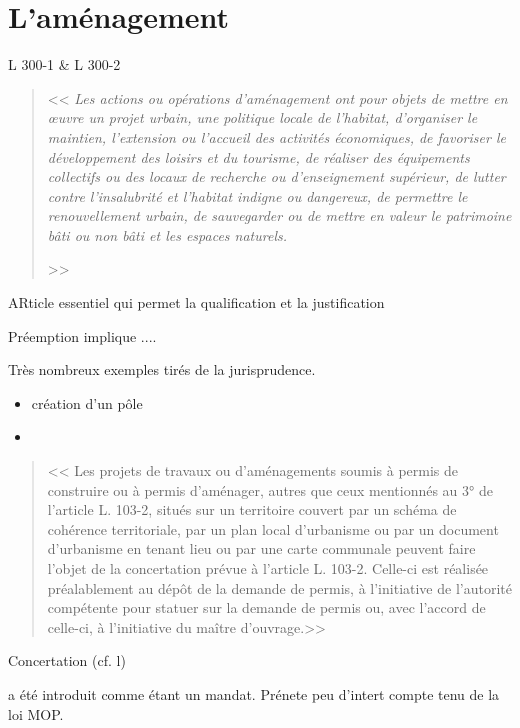 \chapter{L'aménagement}

L 300-1 \& L 300-2

	\begin{quote}
		\textbf{}

		<< {\itshape Les actions ou opérations d'aménagement ont pour objets de mettre en œuvre un projet urbain, une politique locale de l'habitat, d'organiser le maintien, l'extension ou l'accueil des activités économiques, de favoriser le développement des loisirs et du tourisme, de réaliser des équipements collectifs ou des locaux de recherche ou d'enseignement supérieur, de lutter contre l'insalubrité et l'habitat indigne ou dangereux, de permettre le renouvellement urbain, de sauvegarder ou de mettre en valeur le patrimoine bâti ou non bâti et les espaces naturels.}

		\lips >>
	\end{quote}

	ARticle essentiel qui permet la qualification et la justification

	Préemption implique ....

	Très nombreux exemples tirés de la jurisprudence.
	\begin{itemize}
		\item création d'un pôle
		\item
	\end{itemize}

	\begin{quote}
		\textbf{}

		<< {\itshape } Les projets de travaux ou d'aménagements soumis à permis de construire ou à permis d'aménager, autres que ceux mentionnés au 3° de l'article L. 103-2, situés sur un territoire couvert par un schéma de cohérence territoriale, par un plan local d'urbanisme ou par un document d'urbanisme en tenant lieu ou par une carte communale peuvent faire l'objet de la concertation prévue à l'article L. 103-2. Celle-ci est réalisée préalablement au dépôt de la demande de permis, à l'initiative de l'autorité compétente pour statuer sur la demande de permis ou, avec l'accord de celle-ci, à l'initiative du maître d'ouvrage.>>
	\end{quote}

	Concertation (cf. l)

	 a été introduit comme étant un mandat. Prénete peu d'intert compte tenu de la loi MOP.

